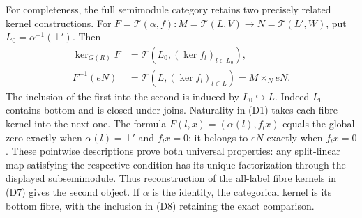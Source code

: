 For completeness, the full semimodule category retains two
precisely related kernel constructions. For
\(F=\mathcal T(\alpha,f):M=\mathcal T(L,V)\to
N=\mathcal T(L',W)\), put \(L_0=\alpha^{-1}(\bot')\). Then
\[
\begin{aligned}
 \ker_{G(R)}F&=\mathcal T(L_0,(\ker f_l)_{l\in L_0}),\\
 F^{-1}(eN)&=\mathcal T(L,(\ker f_l)_{l\in L})
             =M\mathbin{\times}_N eN.
\end{aligned}
\tag{D8}
\]
The inclusion of the first into the second is induced by
\(L_0\hookrightarrow L\). Indeed \(L_0\) contains bottom and is
closed under joins. Naturality in (D1) takes each fibre kernel
into the next one. The formula
\(F(l,x)=(\alpha(l),f_lx)\) equals the global zero exactly when
\(\alpha(l)=\bot'\) and \(f_lx=0\); it belongs to \(eN\)
exactly when \(f_lx=0\). These pointwise descriptions prove both
universal properties: any split-linear map satisfying the
respective condition has its unique factorization through the
displayed subsemimodule. Thus reconstruction of the all-label
fibre kernels in (D7) gives the second object. If \(\alpha\) is
the identity, the categorical kernel is its bottom fibre, with
the inclusion in (D8) retaining the exact comparison.

